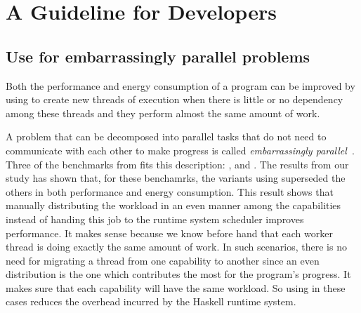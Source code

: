 \chapter{A Guideline for Developers}
\lipsum[1-1]


\section{Use \forkOn for embarrassingly parallel problems}
 Both the performance and energy consumption of a program can be improved by using \forkOn to create new threads of execution when there is little or no dependency among these threads and they perform almost the same amount of work.
\newline

 A problem that can be decomposed into parallel tasks that do not need to communicate with each other to make progress is called \emph{embarrassingly parallel}~\cite{herlihy:2012}. Three of the benchmarks from  fits this description: \mandelbrot, \regex and \spectral. The results from our study has shown that, for these benchamrks, the variants using \forkOn superseded the others in both performance and energy consumption. This result shows that manually distributing the workload in an even manner among the capabilities instead of handing this job to the runtime system scheduler improves performance. It makes sense because we know before hand that each worker thread is doing exactly the same amount of work. In such scenarios, there is no need for migrating a thread from one capability to another since an even distribution is the one which contributes the most for the program's progress. It makes sure that each capability will have the same workload. So using \forkOn in these cases reduces the overhead incurred by the Haskell runtime system.

